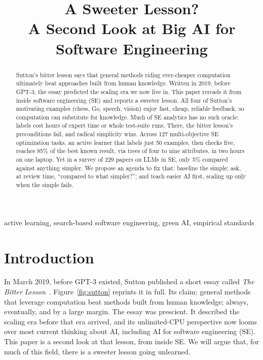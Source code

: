 \documentclass[10pt,conference]{IEEEtran}
\begin{document}
\title{A Sweeter Lesson?\\ A Second Look at Big AI for Software Engineering}

\author{}

\maketitle

\begin{abstract}
Sutton's bitter lesson says that general methods riding ever-cheaper
computation ultimately beat approaches built from human knowledge.
Written in 2019, before GPT-3, the essay predicted the scaling era we
now live in. This paper rereads it from inside software engineering
(SE) and reports a sweeter lesson. All four of Sutton's motivating
examples (chess, Go, speech, vision) enjoy fast, cheap, reliable
feedback, so computation can substitute for knowledge. Much of SE
analytics has no such oracle: labels cost hours of expert time or
whole test-suite runs. There, the bitter lesson's preconditions fail,
and radical simplicity wins. Across 127 multi-objective SE
optimization tasks, an active learner that labels just 50 examples,
then checks five, reaches 85\% of the best known result, via trees of
four to nine attributes, in two hours on one laptop. Yet in a survey
of 229 papers on LLMs in SE, only 5\% compared against anything
simpler. We propose an agenda to fix that: baseline the simple; ask,
at review time, ``compared to what simpler?''; and teach easier AI
first, scaling up only when the simple fails.
\end{abstract}

\begin{IEEEkeywords}
active learning, search-based software engineering, green AI, empirical standards
\end{IEEEkeywords}

\section{Introduction}
In March 2019, before GPT-3 existed, Sutton published a short essay
called {\em The Bitter Lesson}~\cite{sutton19}. Figure~\ref{fig:sutton}
reprints it in full. Its claim: general methods that leverage
computation beat methods built from human knowledge; always,
eventually, and by a large margin. The essay was prescient. It
described the scaling era before that era arrived, and its
unlimited-CPU perspective now looms over most current thinking about
AI, including AI for software engineering (SE). This paper is a
second look at that lesson, from inside SE. We will argue that, for
much of this field, there is a sweeter lesson going unlearned.
\end{document}
